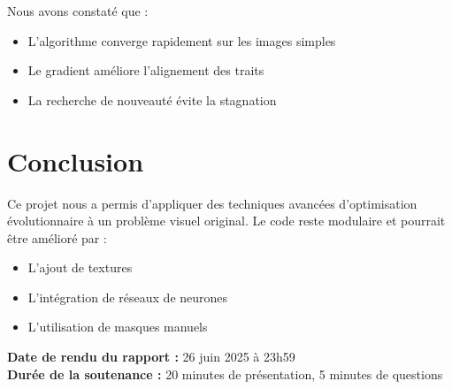 \documentclass[11pt,a4paper]{article}
\begin{document}
Nous avons constaté que :
\begin{itemize}
    \item L'algorithme converge rapidement sur les images simples
    \item Le gradient améliore l'alignement des traits
    \item La recherche de nouveauté évite la stagnation
\end{itemize}

\section{Conclusion}
Ce projet nous a permis d'appliquer des techniques avancées d'optimisation évolutionnaire à un problème visuel original. Le code reste modulaire et pourrait être amélioré par :
\begin{itemize}
    \item L'ajout de textures
    \item L'intégration de réseaux de neurones
    \item L'utilisation de masques manuels
\end{itemize}

\vfill
\noindent\textbf{Date de rendu du rapport :} 26 juin 2025 à 23h59 \\
\textbf{Durée de la soutenance :} 20 minutes de présentation, 5 minutes de questions
\end{document}
